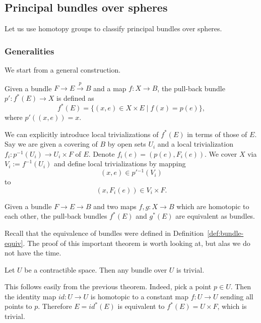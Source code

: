 \documentclass[12pt]{article}
\numberwithin{equation}{section}
\begin{document}
\subsection{Principal bundles over spheres}
\label{sec:bundle-over-sphere}
Let us use homotopy groups to classify principal bundles over spheres.

\subsubsection{Generalities}
We start from a general construction.
\begin{definition}
Given a bundle $F\to E\stackrel{p}{\longrightarrow} B$
and a map $f:X\to B$,
the pull-back bundle $p': f^*(E)\to X$ is defined as \begin{equation}
  f^*(E) = \{ (x,e)\in X\times E \mid f(x)=p(e) \},
\end{equation}
where $p'((x,e))=x$.
\end{definition}
We can explicitly introduce local trivializations of $f^*(E)$ in terms of those of $E$.
Say we are given a covering of $B$ by open sets $U_i$
and a local trivialization $f_i:p^{-1}(U_i)\to U_i\times F$ of $E$.
Denote $f_i(e)=(p(e),F_i(e))$.
We cover $X$ via $V_i:=f^{-1}(U_i)$ and define local trivializations by mapping \begin{equation}
(x,e) \in p'{}^{-1}(V_i) 
\end{equation} to \begin{equation}
(x,F_i(e)) \in V_i\times F.
\end{equation}

\begin{theorem}
Given a bundle $F\to E\to B$
and two maps $f,g:X\to B$ which are homotopic to each other,
the pull-back bundles $f^*(E)$ and $g^*(E)$ are equivalent as bundles.
\end{theorem}
Recall that the equivalence of bundles were defined in Definition~\ref{def:bundle-equiv}.
The proof of this important theorem is worth looking at,
but alas we do not have the time.

\begin{proposition}
  Let $U$ be a contractible space.
  Then any bundle over $U$ is trivial.
\end{proposition}
This follows easily from the previous theorem.
Indeed, pick a point $p\in U$.
Then the identity map $id:U\to U$ is homotopic to a constant map $f:U\to U$ sending all points to $p$.
Therefore $E=id^*(E)$ is equivalent to $f^*(E)=U\times F$, which is trivial.
\end{document}

